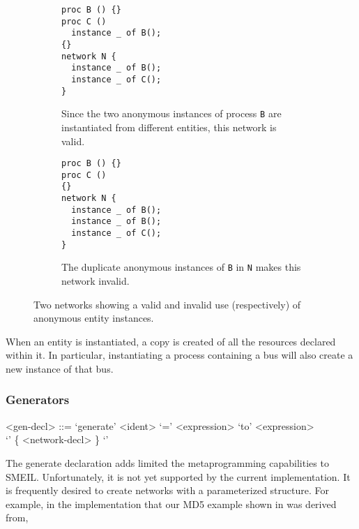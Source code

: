\begin{figure}
  \centering
  \begin{subfigure}[t]{0.40\textwidth}
\begin{lstlisting}[language=smeil]
proc B () {}
proc C ()
  instance _ of B();
{}
network N {
  instance _ of B();
  instance _ of C();
}
\end{lstlisting}
    \caption{Since the two anonymous instances of process {\tt B} are
      instantiated from different entities, this network is valid.}
    \label{fig:ambigvalid}
    \hspace{4mm}
\end{subfigure}
\begin{subfigure}[t]{0.40\textwidth}
\begin{lstlisting}[language=smeil]
proc B () {}
proc C ()
{}
network N {
  instance _ of B();
  instance _ of B();
  instance _ of C();
}
\end{lstlisting}
    \caption{The duplicate anonymous instances of {\tt B} in {\tt N} makes this
      network invalid.}
  \end{subfigure}

  \caption{Two networks showing a valid and invalid use (respectively) of
  anonymous entity instances.}
\label{fig:anonproc}
\end{figure}

When an entity is instantiated, a copy is created of all the resources declared
within it. In particular, instantiating a process containing a bus will also
create a new instance of that bus.


\subsubsection{Generators}
\begin{grammar}
  <gen-decl> ::= `generate' <ident> `=' <expression> `to' <expression> \\ `{' \{ <network-decl> \} `}'
\end{grammar}
The {\ttfamily generate} declaration adds limited the metaprogramming
capabilities to SMEIL. Unfortunately, it is not yet supported by the current
implementation. It is frequently desired to create networks with a parameterized
structure. For example, in the implementation that our MD5 example shown in
 was derived from, 

